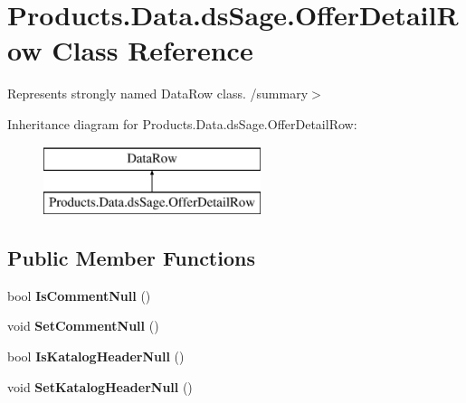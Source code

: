 \hypertarget{class_products_1_1_data_1_1ds_sage_1_1_offer_detail_row}{}\section{Products.\+Data.\+ds\+Sage.\+Offer\+Detail\+Row Class Reference}
\label{class_products_1_1_data_1_1ds_sage_1_1_offer_detail_row}


Represents strongly named Data\+Row class. /summary$>$  


Inheritance diagram for Products.\+Data.\+ds\+Sage.\+Offer\+Detail\+Row\+:\begin{figure}[H]
\begin{center}
\leavevmode
\includegraphics[height=2.000000cm]{class_products_1_1_data_1_1ds_sage_1_1_offer_detail_row}
\end{center}
\end{figure}
\subsection*{Public Member Functions}
\begin{DoxyCompactItemize}
\item 
bool {\bfseries Is\+Comment\+Null} ()\hypertarget{class_products_1_1_data_1_1ds_sage_1_1_offer_detail_row_ad630480b0dbae1b2b7745af4fcb9f0f3}{}\label{class_products_1_1_data_1_1ds_sage_1_1_offer_detail_row_ad630480b0dbae1b2b7745af4fcb9f0f3}

\item 
void {\bfseries Set\+Comment\+Null} ()\hypertarget{class_products_1_1_data_1_1ds_sage_1_1_offer_detail_row_a957623f9bdb10284b63c97d3e49149a6}{}\label{class_products_1_1_data_1_1ds_sage_1_1_offer_detail_row_a957623f9bdb10284b63c97d3e49149a6}

\item 
bool {\bfseries Is\+Katalog\+Header\+Null} ()\hypertarget{class_products_1_1_data_1_1ds_sage_1_1_offer_detail_row_a9550398658b1b5b64dd6e85fb5097dd8}{}\label{class_products_1_1_data_1_1ds_sage_1_1_offer_detail_row_a9550398658b1b5b64dd6e85fb5097dd8}

\item 
void {\bfseries Set\+Katalog\+Header\+Null} ()\hypertarget{class_products_1_1_data_1_1ds_sage_1_1_offer_detail_row_afcaf53fa10aa3e96d662a34dfe03e29f}{}\label{class_products_1_1_data_1_1ds_sage_1_1_offer_detail_row_afcaf53fa10aa3e96d662a34dfe03e29f}

\end{DoxyCompactItemize}
